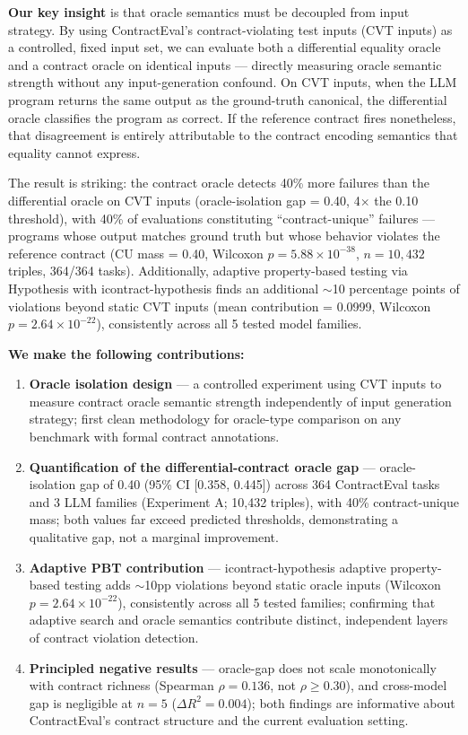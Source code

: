 \textbf{Our key insight} is that oracle semantics must be decoupled from input strategy. By using ContractEval's contract-violating test inputs (CVT inputs) as a controlled, fixed input set, we can evaluate both a differential equality oracle and a contract oracle on identical inputs --- directly measuring oracle semantic strength without any input-generation confound. On CVT inputs, when the LLM program returns the same output as the ground-truth canonical, the differential oracle classifies the program as correct. If the reference contract fires nonetheless, that disagreement is entirely attributable to the contract encoding semantics that equality cannot express.

The result is striking: the contract oracle detects 40\% more failures than the differential oracle on CVT inputs (oracle-isolation gap = 0.40, 4$\times$ the 0.10 threshold), with 40\% of evaluations constituting ``contract-unique'' failures --- programs whose output matches ground truth but whose behavior violates the reference contract (CU mass = 0.40, Wilcoxon $p = 5.88 \times 10^{-38}$, $n = 10{,}432$ triples, 364/364 tasks). Additionally, adaptive property-based testing via Hypothesis with icontract-hypothesis finds an additional $\sim$10 percentage points of violations beyond static CVT inputs (mean contribution = 0.0999, Wilcoxon $p = 2.64 \times 10^{-22}$), consistently across all 5 tested model families.

\textbf{We make the following contributions:}

\begin{enumerate}
\item \textbf{Oracle isolation design} --- a controlled experiment using CVT inputs to measure contract oracle semantic strength independently of input generation strategy; first clean methodology for oracle-type comparison on any benchmark with formal contract annotations.

\item \textbf{Quantification of the differential-contract oracle gap} --- oracle-isolation gap of 0.40 (95\% CI [0.358, 0.445]) across 364 ContractEval tasks and 3 LLM families (Experiment A; 10,432 triples), with 40\% contract-unique mass; both values far exceed predicted thresholds, demonstrating a qualitative gap, not a marginal improvement.

\item \textbf{Adaptive PBT contribution} --- icontract-hypothesis adaptive property-based testing adds $\sim$10pp violations beyond static oracle inputs (Wilcoxon $p = 2.64 \times 10^{-22}$), consistently across all 5 tested families; confirming that adaptive search and oracle semantics contribute distinct, independent layers of contract violation detection.

\item \textbf{Principled negative results} --- oracle-gap does not scale monotonically with contract richness (Spearman $\rho = 0.136$, not $\rho \geq 0.30$), and cross-model gap is negligible at $n=5$ ($\Delta R^2 = 0.004$); both findings are informative about ContractEval's contract structure and the current evaluation setting.
\end{enumerate}

